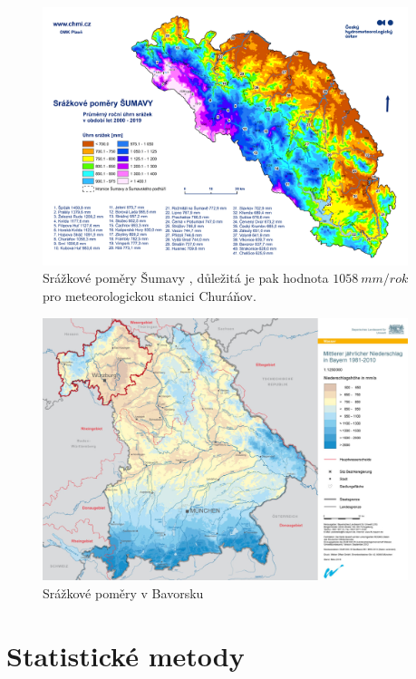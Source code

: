\begin{figure}
	\centering
	\includegraphics[width=0.95\textwidth]{img/ch1/srazkovepomerysumava.png}
	\caption{Srážkové poměry Šumavy \parencite{srazkovepomerysumava}, důležitá je pak hodnota $\SI{1058}{mm/rok}$ pro meteorologickou stanici Churáňov.}
	\label{fig:srazkovepomerysumava}
\end{figure}

\begin{figure}
	\centering
	\includegraphics[width=0.95\textwidth]{img/ch1/srazkovepomerybavorskyles.png}
	\caption{Srážkové poměry v Bavorsku \parencite{srazkovepomerybavorskyles}}
	\label{fig:srazkovepomerybavorskyles}
\end{figure}

\clearpage

\section{Statistické metody}\label{chap:statistika}

